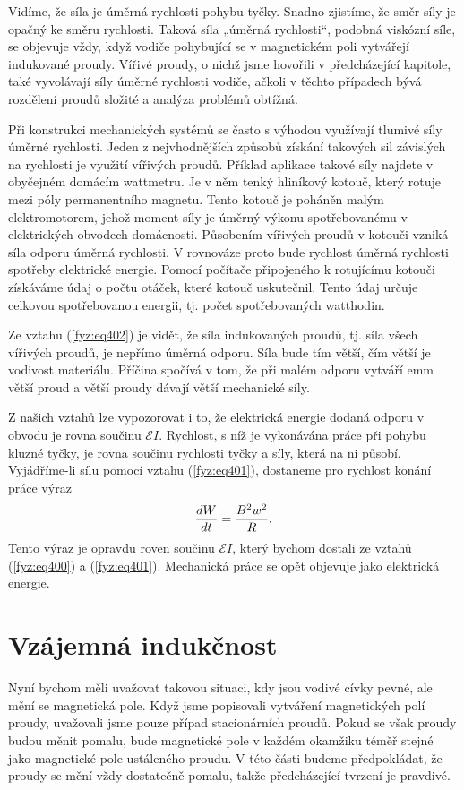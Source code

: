 {  Vidíme, že síla je úměrná rychlosti pohybu tyčky. Snadno zjistíme, že směr síly je opačný ke 
  směru rychlosti. Taková síla „úměrná rychlosti“, podobná viskózní síle, se objevuje vždy, když 
  vodiče pohybující se v magnetickém poli vytvářejí indukované proudy. Vířivé proudy, o nichž jsme 
  hovořili v předcházející kapitole, také vyvolávají síly úměrné rychlosti vodiče, ačkoli v těchto 
  případech bývá rozdělení proudů složité a analýza problémů obtížná. 
  
  Při konstrukci mechanických systémů se často s výhodou využívají tlumivé síly úměrné rychlosti. 
  Jeden z nejvhodnějších způsobů získání takových sil závislých na rychlosti je využití vířivých 
  proudů. Příklad aplikace takové síly najdete v obyčejném domácím wattmetru. Je v něm tenký 
  hliníkový kotouč, který rotuje mezi póly permanentního magnetu. Tento kotouč je poháněn malým 
  elektromotorem, jehož moment síly je úměrný výkonu spotřebovanému v elektrických obvodech 
  domácnosti. Působením vířivých proudů v kotouči vzniká síla odporu úměrná rychlosti. V rovnováze 
  proto bude rychlost úměrná rychlosti spotřeby elektrické energie. Pomocí počítače připojeného k 
  rotujícímu kotouči získáváme údaj o počtu otáček, které kotouč uskutečnil. Tento údaj určuje 
  celkovou spotřebovanou energii, tj. počet spotřebovaných watthodin. 
  
  Ze vztahu (\ref{fyz:eq402}) je vidět, že síla indukovaných proudů, tj. síla všech vířivých 
  proudů, je nepřímo úměrná odporu. Síla bude tím větší, čím větší je vodivost materiálu. Příčina 
  spočívá v tom, že při malém odporu vytváří emm větší proud a větší proudy dávají větší mechanické 
  síly. 
  
  Z našich vztahů lze vypozorovat i to, že elektrická energie dodaná odporu v obvodu je rovna 
  součinu \(\mathscr{E}I\). Rychlost, s níž je vykonávána práce při pohybu kluzné tyčky, je rovna 
  součinu rychlosti tyčky a síly, která na ni působí. Vyjádříme-li sílu pomocí vztahu 
  (\ref{fyz:eq401}), dostaneme pro rychlost konání práce výraz
  \begin{equation}\label{fyz:eq403}
    \dfrac{d W}{d t} = \frac{B^2w^2}{R}.
  \end{equation}  
  Tento výraz je opravdu roven součinu \(\mathscr{E}I\), který bychom dostali ze vztahů 
  (\ref{fyz:eq400}) a (\ref{fyz:eq401}). Mechanická práce se opět objevuje jako elektrická energie.
  
\section{Vzájemná indukčnost}\label{fyz:IIchapXVIIsecVI}
  Nyní bychom měli uvažovat takovou situaci, kdy jsou vodivé cívky pevné, ale mění se magnetická 
  pole. Když jsme popisovali vytváření magnetických polí proudy, uvažovali jsme pouze případ 
  stacionárních proudů. Pokud se však proudy budou měnit pomalu, bude magnetické pole v každém 
  okamžiku téměř stejné jako magnetické pole ustáleného proudu. V této části budeme předpokládat, 
  že proudy se mění vždy dostatečně pomalu, takže předcházející tvrzení je pravdivé.
  
}

